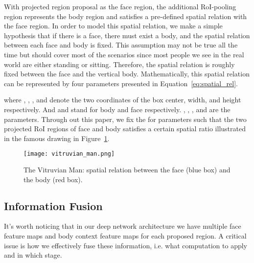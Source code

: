 \documentclass[10pt,journal,cspaper,compsoc]{IEEEtran}
\begin{document}
With projected region proposal as the face region, the additional RoI-pooling region represents the body region and satisfies a pre-defined spatial relation with the face region. In order to model this spatial relation, we make a simple hypothesis that if there is a face, there must exist a body, and the spatial relation between each face and body is fixed. This assumption may not be true all the time but should cover most of the scenarios since most people we see in the real world are either standing or sitting. Therefore, the spatial relation is roughly fixed between the face and the vertical body. 
Mathematically, this spatial relation can be represented by four parameters presented in Equation~\ref{eq:spatial_rel}. 

where , , , and   denote the two coordinates of the box center, width, and height respectively. And  and  stand for body and face respectively. , , , and  are the parameters. Through out this paper, we fix the for parameters such that the two projected RoI regions of face and body satisfies a certain spatial ratio illustrated in the famous drawing in Figure~\ref{fig:man}.
\begin{figure}
    \centering
    \texttt{[image: vitruvian\_man.png]}
    \caption{The Vitruvian Man: spatial relation between the face (blue box) and the body (red box).}
    \label{fig:man}
\end{figure}

\subsection{Information Fusion}
\label{subsec:info_fuse}
It's worth noticing that in our deep network architecture we have multiple face feature maps and body context feature maps for each proposed region. A critical issue is how we effectively fuse these information, i.e. what computation to apply and in which stage.
\end{document}
